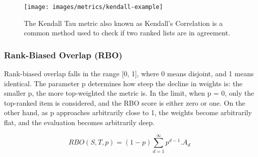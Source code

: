 \begin{figure}[!h]
	\centering
	\texttt{[image: images/metrics/kendall-example]}
	\caption{The Kendall Tau metric also known as Kendall’s Correlation is a common method used to check if two ranked lists are in agreement.}
	\label{fig:kendall-rank-example}
\end{figure}

\subsubsection{Rank-Biased Overlap (RBO)}
Rank-biased overlap falls in the range [0, 1], where 0 means disjoint, and 1 means identical. The parameter p determines how steep the decline in weights is: the smaller p, the
more top-weighted the metric is. In the limit, when p = 0, only the top-ranked item is considered, and the RBO score is either zero or one. 
On the other hand, as p approaches arbitrarily close to 1, the weights become arbitrarily flat, and the evaluation becomes arbitrarily deep.

\begin{equation}
	RBO(S,T,p) = (1-p)\sum_{d=1}^{\infty}p^{d-1}.A_{d}
	\label{eq:rbo}
\end{equation}
